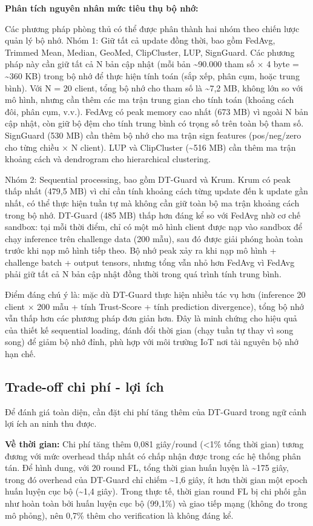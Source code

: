 \textbf{Phân tích nguyên nhân mức tiêu thụ bộ nhớ:}

Các phương pháp phòng thủ có thể được phân thành hai nhóm theo chiến lược quản lý bộ nhớ. Nhóm 1: Giữ tất cả update đồng thời, bao gồm FedAvg, Trimmed Mean, Median, GeoMed, ClipCluster, LUP, SignGuard. Các phương pháp này cần giữ tất cả N bản cập nhật (mỗi bản \textasciitilde90.000 tham số $\times$ 4 byte = \textasciitilde360 KB) trong bộ nhớ để thực hiện tính toán (sắp xếp, phân cụm, hoặc trung bình). Với N = 20 client, tổng bộ nhớ cho tham số là \textasciitilde7,2 MB, không lớn so với mô hình, nhưng cần thêm các ma trận trung gian cho tính toán (khoảng cách đôi, phân cụm, v.v.). FedAvg có peak memory cao nhất (673 MB) vì ngoài N bản cập nhật, còn giữ bộ đệm cho tính trung bình có trọng số trên toàn bộ tham số. SignGuard (530 MB) cần thêm bộ nhớ cho ma trận sign features (pos/neg/zero cho từng chiều $\times$ N client). LUP và ClipCluster (\textasciitilde516 MB) cần thêm ma trận khoảng cách và dendrogram cho hierarchical clustering.

Nhóm 2: Sequential processing, bao gồm DT-Guard và Krum. Krum có peak thấp nhất (479,5 MB) vì chỉ cần tính khoảng cách từng update đến k update gần nhất, có thể thực hiện tuần tự mà không cần giữ toàn bộ ma trận khoảng cách trong bộ nhớ. DT-Guard (485 MB) thấp hơn đáng kể so với FedAvg nhờ cơ chế sandbox: tại mỗi thời điểm, chỉ có một mô hình client được nạp vào sandbox để chạy inference trên challenge data (200 mẫu), sau đó được giải phóng hoàn toàn trước khi nạp mô hình tiếp theo. Bộ nhớ peak xảy ra khi nạp mô hình + challenge batch + output tensors, nhưng tổng vẫn nhỏ hơn FedAvg vì FedAvg phải giữ tất cả N bản cập nhật đồng thời trong quá trình tính trung bình.

Điểm đáng chú ý là: mặc dù DT-Guard thực hiện nhiều tác vụ hơn (inference 20 client $\times$ 200 mẫu + tính Trust-Score + tính prediction divergence), tổng bộ nhớ vẫn thấp hơn các phương pháp đơn giản hơn. Đây là minh chứng cho hiệu quả của thiết kế sequential loading, đánh đổi thời gian (chạy tuần tự thay vì song song) để giảm bộ nhớ đỉnh, phù hợp với môi trường IoT nơi tài nguyên bộ nhớ hạn chế.

\subsection{Trade-off chi phí - lợi ích}
Để đánh giá toàn diện, cần đặt chi phí tăng thêm của DT-Guard trong ngữ cảnh lợi ích an ninh thu được.

\textbf{Về thời gian:} Chi phí tăng thêm 0,081 giây/round (\textless 1\% tổng thời gian) tương đương với mức overhead thấp nhất có chấp nhận được trong các hệ thống phân tán. Để hình dung, với 20 round FL, tổng thời gian huấn luyện là \textasciitilde175 giây, trong đó overhead của DT-Guard chỉ chiếm \textasciitilde1,6 giây, ít hơn thời gian một epoch huấn luyện cục bộ (\textasciitilde1,4 giây). Trong thực tế, thời gian round FL bị chi phối gần như hoàn toàn bởi huấn luyện cục bộ (99,1\%) và giao tiếp mạng (không đo trong mô phỏng), nên 0,7\% thêm cho verification là không đáng kể.

